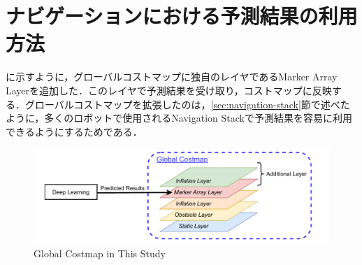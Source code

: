 \section{ナビゲーションにおける予測結果の利用方法}
に示すように，グローバルコストマップに独自のレイヤであるMarker Array Layerを追加した．このレイヤで予測結果を受け取り，コストマップに反映する．グローバルコストマップを拡張したのは，\ref{sec:navigation-stack}節で述べたように，多くのロボットで使用されるNavigation Stackで予測結果を容易に利用できるようにするためである．

\begin{figure}[H]
  \centering
 \includegraphics[keepaspectratio, scale=0.73]
      {images/layer.pdf}
\caption{Global Costmap in This Study}
 \label{Fig:global-costmap}
\end{figure} 

\newpage
